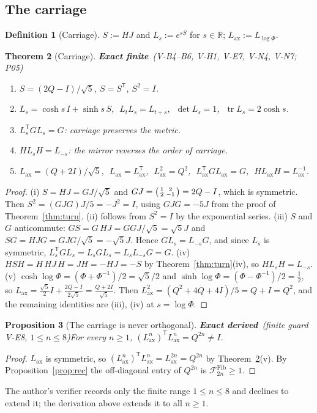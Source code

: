 \documentclass[11pt,a4paper]{article}
\newcommand{\RR}{\mathbb{R}}\newcommand{\QQ}{\mathbb{Q}}\newcommand{\ZZ}{\mathbb{Z}}
\newcommand{\tp}{^{\mathsf T}}
\DeclareMathOperator{\tr}{tr}\DeclareMathOperator{\sig}{sig}\DeclareMathOperator{\arccosh}{arccosh}
\newcommand{\Lax}{L_{\mathrm{ax}}}\newcommand{\Lpr}{L_{\mathrm{pr}}}
\newcommand{\Fib}[1]{\mathcal{F}^{\mathrm{Fib}}_{#1}}\newcommand{\Luc}[1]{\mathcal{L}^{\mathrm{Luc}}_{#1}}
\newcommand{\st}[1]{\textsf{\small\textbf{#1}}}
\newcommand{\Sfin}{\st{Exact finite}}\newcommand{\Sder}{\st{Exact derived}}
\theoremstyle{plain}
\newtheorem{thm}{Theorem}[section]
\newtheorem{prop}[thm]{Proposition}
\theoremstyle{definition}
\newtheorem{defn}[thm]{Definition}
\theoremstyle{remark}
\begin{document}
\subsection{The carriage}
\begin{defn}[Carriage]
$S:=HJ$ and $L_s:=e^{sS}$ for $s\in\RR$; $\Lax:=L_{\log\Phi}$.
\end{defn}
\begin{thm}[Carriage]\Sfin\ \textit{(V-B4--B6, V-H1, V-E7, V-N4, V-N7; P05)}\label{thm:carriage}
\begin{enumerate}[label=(\roman*),nosep]
\item $S=(2Q-I)/\sqrt5$, $S=S\tp$, $S^2=I$.
\item $L_s=\cosh s\,I+\sinh s\,S$, $\;L_tL_s=L_{t+s}$, $\;\det L_s=1$, $\;\tr L_s=2\cosh s$.
\item $L_s\tp GL_s=G$: carriage preserves the metric.
\item $HL_sH=L_{-s}$: the mirror reverses the order of carriage.
\item $\Lax=(Q+2I)/\sqrt5$, $\;\Lax=\Lax\tp$, $\;\Lax^2=Q^2$, $\;\Lax\tp G\Lax=G$, $\;H\Lax H=\Lax^{-1}$.
\end{enumerate}
\end{thm}
\begin{proof}
(i) $S=HJ=GJ/\sqrt5$ and $GJ=\begin{psmallmatrix}1&2\\2&-1\end{psmallmatrix}=2Q-I$, which is symmetric. Then $S^2=(GJG)J/5=-J^2=I$, using $GJG=-5J$ from the proof of Theorem~\ref{thm:turn}. (ii) follows from $S^2=I$ by the exponential series. (iii) $S$ and $G$ anticommute: $GS=G\,HJ=GGJ/\sqrt5=\sqrt5J$ and $SG=HJG=GJG/\sqrt5=-\sqrt5J$. Hence $GL_s=L_{-s}G$, and since $L_s$ is symmetric, $L_s\tp GL_s=L_sGL_s=L_sL_{-s}G=G$. (iv) $HSH=H\,HJ\,H=JH=-HJ=-S$ by Theorem~\ref{thm:turn}(iv), so $HL_sH=L_{-s}$. (v) $\cosh\log\Phi=(\Phi+\Phi^{-1})/2=\sqrt5/2$ and $\sinh\log\Phi=(\Phi-\Phi^{-1})/2=\tfrac12$, so $\Lax=\tfrac{\sqrt5}2I+\tfrac{2Q-I}{2\sqrt5}=\tfrac{Q+2I}{\sqrt5}$. Then $\Lax^2=(Q^2+4Q+4I)/5=Q+I=Q^2$, and the remaining identities are (iii), (iv) at $s=\log\Phi$.
\end{proof}
\begin{prop}[The carriage is never orthogonal]\Sder\ \textit{(finite guard V-E8, $1\le n\le8$)}\label{prop:nonorth}
For every $n\ge1$, $(\Lax^n)\tp\Lax^n=Q^{2n}\neq I$.
\end{prop}
\begin{proof}
$\Lax$ is symmetric, so $(\Lax^n)\tp\Lax^n=\Lax^{2n}=Q^{2n}$ by Theorem~\ref{thm:carriage}(v). By Proposition~\ref{prop:rec} the off-diagonal entry of $Q^{2n}$ is $\Fib{2n}\ge1$.
\end{proof}
The author's verifier records only the finite range $1\le n\le8$ and declines to extend it; the derivation above extends it to all $n\ge1$.
\end{document}

